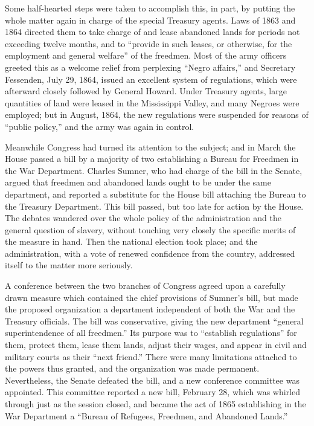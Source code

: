 Some half-hearted steps were taken to accomplish this, in part, by putting the whole matter again in charge of the special Treasury agents. Laws of 1863 and 1864 directed them to take charge of and lease abandoned lands for periods not exceeding twelve months, and to “provide in such leases, or otherwise, for the employment and general welfare” of the freedmen. Most of the army officers greeted this as a welcome relief from perplexing “Negro affairs,” and Secretary Fessenden, July 29, 1864, issued an excellent system of regulations, which were afterward closely followed by General Howard. Under Treasury agents, large quantities of land were leased in the Mississippi Valley, and many Negroes were employed; but in August, 1864, the new regulations were suspended for reasons of “public policy,” and the army was again in control.\par

Meanwhile Congress had turned its attention to the subject; and in March the House passed a bill by a majority of two establishing a Bureau for Freedmen in the War Department. Charles Sumner, who had charge of the bill in the Senate, argued that freedmen and abandoned lands ought to be under the same department, and reported a substitute for the House bill attaching the Bureau to the Treasury Department. This bill passed, but too late for action by the House. The debates wandered over the whole policy of the administration and the general question of slavery, without touching very closely the specific merits of the measure in hand. Then the national election took place; and the administration, with a vote of renewed confidence from the country, addressed itself to the matter more seriously.\par

A conference between the two branches of Congress agreed upon a carefully drawn measure which contained the chief provisions of Sumner’s bill, but made the proposed organization a department independent of both the War and the Treasury officials. The bill was conservative, giving the new department “general superintendence of all freedmen.” Its purpose was to “establish regulations” for them, protect them, lease them lands, adjust their wages, and appear in civil and military courts as their “next friend.” There were many limitations attached to the powers thus granted, and the organization was made permanent. Nevertheless, the Senate defeated the bill, and a new conference committee was appointed. This committee reported a new bill, February 28, which was whirled through just as the session closed, and became the act of 1865 establishing in the War Department a “Bureau of Refugees, Freedmen, and Abandoned Lands.”\par

